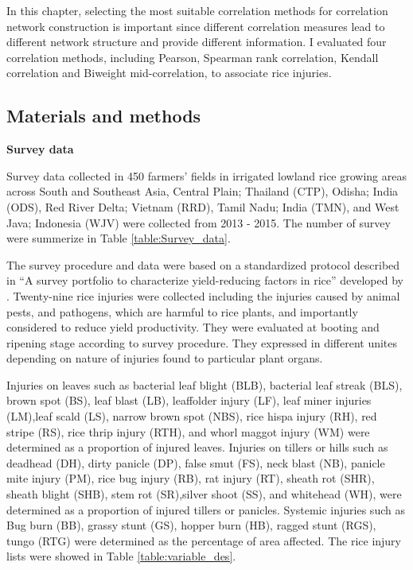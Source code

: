 In this chapter, selecting the most suitable correlation methods for correlation network construction is important since different correlation measures lead to different network structure and provide different information. I evaluated four correlation methods, including Pearson, Spearman rank correlation, Kendall correlation \citep{Prokhorov_2001_Kendall} and Biweight mid-correlation, to associate rice injuries. 

\subsection*{Materials and methods}
\textbf{Survey data}

Survey data collected in 450 farmers’ fields in irrigated lowland rice growing areas across South and Southeast Asia, Central Plain; Thailand (CTP), Odisha; India (ODS), Red River Delta; Vietnam (RRD), Tamil Nadu; India (TMN), and West Java; Indonesia (WJV) were collected from 2013 - 2015. The number of survey were summerize in Table \ref{table:Survey_data}.



The survey procedure and data were based on a standardized protocol described in ``A survey portfolio to characterize yield-reducing factors in rice'' developed by \citet{Savary_2009_Survey}. Twenty-nine rice injuries were collected  including the injuries caused by animal pests, and pathogens, which are harmful to rice plants, and importantly considered to reduce yield productivity. They were evaluated at booting and ripening stage according to survey procedure. They expressed in different unites depending on nature of injuries found to particular plant organs. 

Injuries on leaves such as  bacterial leaf blight (BLB), bacterial leaf streak (BLS), brown spot (BS), leaf blast (LB), leaffolder injury (LF),  leaf miner injuries (LM),leaf scald (LS), narrow brown spot (NBS), rice hispa injury (RH), red stripe (RS), rice thrip injury (RTH), and whorl maggot injury (WM) were determined as a proportion of injured leaves. Injuries on tillers or hills such as deadhead (DH), dirty panicle (DP), false smut (FS),  neck blast (NB), panicle mite injury (PM), rice bug injury (RB), rat injury (RT), sheath rot (SHR), sheath blight (SHB), stem rot (SR),silver shoot (SS), and whitehead (WH), were determined as a proportion of injured tillers or panicles. Systemic injuries such as Bug burn (BB), grassy stunt (GS), hopper burn (HB), ragged stunt (RGS), tungo (RTG) were determined as the percentage of area affected. The rice injury lists were showed in Table \ref{table:variable_des}.

